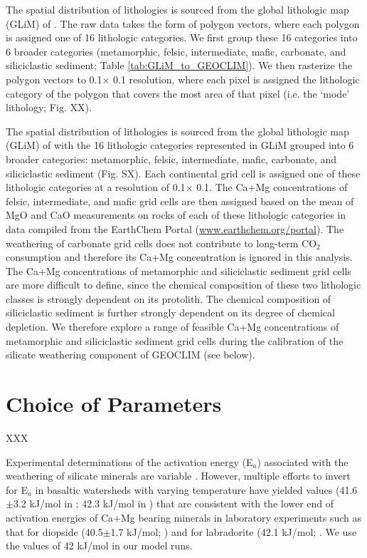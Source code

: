\documentclass[11pt,letterpaper]{article}
\newcommand{\degrees}{\textdegree\xspace}
\newcommand{\COtwo}{CO$_{2}$\xspace}
\begin{document}
The spatial distribution of lithologies is sourced from the global lithologic map (GLiM) of \citet{Hartmann2012a}. The raw data takes the form of polygon vectors, where each polygon is assigned one of 16 lithologic categories. We first group these 16 categories into 6 broader categories (metamorphic, felsic, intermediate, mafic, carbonate, and siliciclastic sediment; Table \ref{tab:GLiM_to_GEOCLIM}). We then rasterize the polygon vectors to 0.1\degrees $\times$ 0.1\degrees resolution, where each pixel is assigned the lithologic category of the polygon that covers the most area of that pixel (i.e. the `mode' lithology; Fig. XX).



The spatial distribution of lithologies is sourced from the global lithologic map (GLiM) of \citet{Hartmann2012a} with the 16 lithologic categories represented in GLiM grouped into 6 broader categories: metamorphic, felsic, intermediate, mafic, carbonate, and siliciclastic sediment (Fig. SX). Each continental grid cell is assigned one of these lithologic categories at a resolution of 0.1\degrees $\times$ 0.1\degrees. The Ca+Mg concentrations of felsic, intermediate, and mafic grid cells are then assigned based on the mean of MgO and CaO measurements on rocks of each of these lithologic categories in data compiled from the EarthChem Portal (\url{www.earthchem.org/portal}). The weathering of carbonate grid cells does not contribute to long-term \COtwo consumption and therefore its Ca+Mg concentration is ignored in this analysis. The Ca+Mg concentrations of metamorphic and siliciclastic sediment grid cells are more difficult to define, since the chemical composition of these two lithologic classes is strongly dependent on its protolith. The chemical composition of siliciclastic sediment is further strongly dependent on its degree of chemical depletion. We therefore explore a range of feasible Ca+Mg concentrations of metamorphic and siliciclastic sediment grid cells during the calibration of the silicate weathering component of GEOCLIM (see below).

\section*{Choice of Parameters}

XXX

Experimental determinations of the activation energy (E$_a$) associated with the weathering of silicate minerals are variable \citep{Brantley2003a}. However, multiple efforts to invert for E$_a$ in basaltic watersheds with varying temperature have yielded values (41.6$\pm$3.2 kJ/mol in \citealp{Li2016a}; 42.3 kJ/mol in \citealp{Dessert2001a}) that are consistent with the lower end of activation energies of Ca+Mg bearing minerals in laboratory experiments such as that for diopside (40.5$\pm$1.7 kJ/mol; \citealp{Knauss1993a}) and for labradorite (42.1 kJ/mol; \citealp{Carroll2005a}. We use the values of 42 kJ/mol in our model runs.

\clearpage

\singlespacing

\newpage



\end{document}
